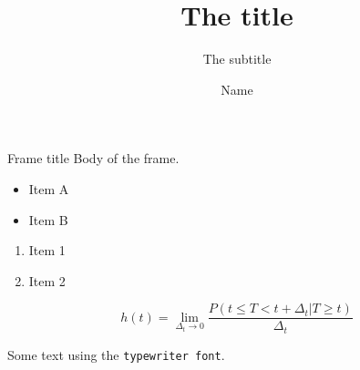 \documentclass{beamer}
\title{The title}
\subtitle{The subtitle}
\author{Name}
\begin{document}
\begin{frame}
	\titlepage
\end{frame}

\begin{frame}{Frame title}
	Body of the frame.

	\begin{itemize}
		\item Item A
		\item Item B
	\end{itemize}

	\begin{enumerate}
		\item Item 1
		\item Item 2
	\end{enumerate}

	\[
		h(t) = \lim_{\Delta_t \to 0} \frac{P(t \le T < t + \Delta_t | T \ge t)}{\Delta_t}
	\]

	Some text using the \texttt{typewriter font}.

\end{frame}
\end{document}
